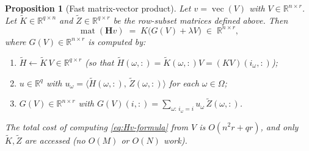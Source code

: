 \documentclass[12pt]{article}
\newtheorem{proposition}[theorem]{Proposition}
\theoremstyle{definition}
\newcommand{\vecop}{\operatorname{vec}}
\newcommand{\matop}{\operatorname{mat}}
\newcommand{\R}{\mathbb{R}}
\newcommand{\Ht}{\widetilde{H}}
\newcommand{\Kt}{\widetilde{K}}
\newcommand{\Zt}{\widetilde{Z}}
\begin{document}
\begin{proposition}[Fast matrix-vector product]\label{prop:matvec}
Let $v=\vecop(V)$ with $V\in\R^{n\times r}$. Let $\Kt\in\R^{q\times n}$ and
$\Zt\in\R^{q\times r}$ be the row-subset matrices defined above. Then
\begin{equation}\label{eq:Hv-formula}
\matop(\mathbf{H}v) \;=\; K\bigl(G(V) + \lambda V\bigr) \;\in\;\R^{n\times r},
\end{equation}
where $G(V)\in\R^{n\times r}$ is computed by:
\begin{enumerate}
\item[(A)] $\Ht\leftarrow \Kt\, V \in\R^{q\times r}$ (so that $\Ht(\omega,:)=\Kt(\omega,:)V=
(KV)(i_\omega,:)$);
\item[(B)] $u\in\R^q$ with $u_\omega = \langle \Ht(\omega,:),\,\Zt(\omega,:)\rangle$ for each
$\omega\in\Omega$;
\item[(C)] $G(V)\in\R^{n\times r}$ with $G(V)(i,:)=\sum_{\omega:\,i_\omega=i} u_\omega\,\Zt(\omega,:)$.
\end{enumerate}
The total cost of computing \eqref{eq:Hv-formula} from $V$ is $O(n^2 r+qr)$, and only $\Kt,\Zt$
are accessed (no $O(M)$ or $O(N)$ work).
\end{proposition}
\end{document}
